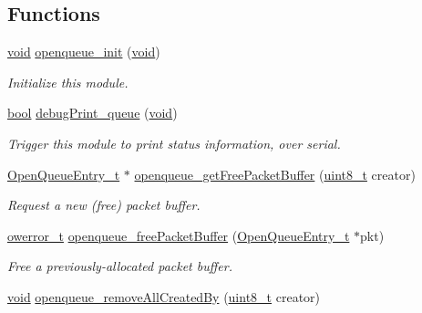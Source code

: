 \subsection*{Functions}
\begin{DoxyCompactItemize}
\item 
\hyperlink{usb__devapi_8h_afabf60e7f57651d6d595a02c75f07cd0}{void} \hyperlink{group___open_queue_ga9ff14ef9d45f660f007b597d5954724e}{openqueue\+\_\+init} (\hyperlink{usb__devapi_8h_afabf60e7f57651d6d595a02c75f07cd0}{void})
\begin{DoxyCompactList}\small\item\em Initialize this module. \end{DoxyCompactList}\item 
\hyperlink{_p_e___types_8h_a97a80ca1602ebf2303258971a2c938e2}{bool} \hyperlink{group___open_queue_ga38fcfaa1cfdce93705865854766bc282}{debug\+Print\+\_\+queue} (\hyperlink{usb__devapi_8h_afabf60e7f57651d6d595a02c75f07cd0}{void})
\begin{DoxyCompactList}\small\item\em Trigger this module to print status information, over serial. \end{DoxyCompactList}\item 
\hyperlink{struct_open_queue_entry__t}{Open\+Queue\+Entry\+\_\+t} $\ast$ \hyperlink{group___open_queue_ga40baa99cf50015c0f478b699c54ad211}{openqueue\+\_\+get\+Free\+Packet\+Buffer} (\hyperlink{_p_e___types_8h_aba7bc1797add20fe3efdf37ced1182c5}{uint8\+\_\+t} creator)
\begin{DoxyCompactList}\small\item\em Request a new (free) packet buffer. \end{DoxyCompactList}\item 
\hyperlink{opendefs_8h_af20b7c3ed9d2ba19e56a309ad9314803}{owerror\+\_\+t} \hyperlink{group___open_queue_ga326f90b6a0c7a331257b524a5af236d4}{openqueue\+\_\+free\+Packet\+Buffer} (\hyperlink{struct_open_queue_entry__t}{Open\+Queue\+Entry\+\_\+t} $\ast$pkt)
\begin{DoxyCompactList}\small\item\em Free a previously-\/allocated packet buffer. \end{DoxyCompactList}\item 
\hyperlink{usb__devapi_8h_afabf60e7f57651d6d595a02c75f07cd0}{void} \hyperlink{group___open_queue_gade7d9553bb4ff27f1285bbc4905d7831}{openqueue\+\_\+remove\+All\+Created\+By} (\hyperlink{_p_e___types_8h_aba7bc1797add20fe3efdf37ced1182c5}{uint8\+\_\+t} creator)

\end{DoxyCompactItemize}

